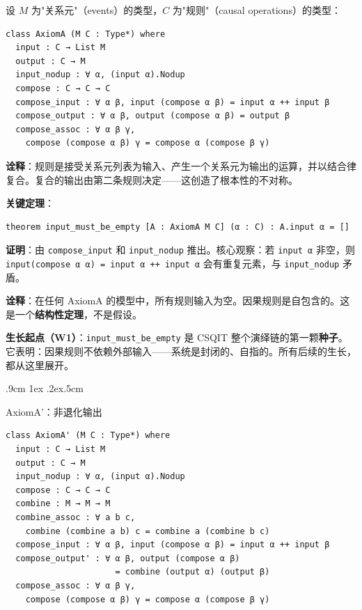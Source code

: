 \documentclass[aps,prd,twocolumn,nofootinbib,floatfix]{revtex4-2}
\makeatletter
\def\subsection{%
  \@startsection{subsection}{2}{\z@}
    {.9cm \@plus1ex \@minus .2ex}{.5cm}
    {\normalfont\large\bfseries\raggedright}%
}
\makeatother
\begin{document}
设 $M$ 为"关系元"（events）的类型，$C$ 为"规则"（causal operations）的类型：

{\scriptsize\begin{verbatim}
class AxiomA (M C : Type*) where
  input : C → List M
  output : C → M
  input_nodup : ∀ α, (input α).Nodup
  compose : C → C → C
  compose_input : ∀ α β, input (compose α β) = input α ++ input β
  compose_output : ∀ α β, output (compose α β) = output β
  compose_assoc : ∀ α β γ,
    compose (compose α β) γ = compose α (compose β γ)
\end{verbatim}}

\textbf{诠释}：规则是接受关系元列表为输入、产生一个关系元为输出的运算，并以结合律复合。复合的输出由第二条规则决定——这创造了根本性的不对称。

\textbf{关键定理}：

{\scriptsize\begin{verbatim}
theorem input_must_be_empty [A : AxiomA M C] (α : C) : A.input α = []
\end{verbatim}}

\textbf{证明}：由 \texttt{compose\_input} 和 \texttt{input\_nodup} 推出。核心观察：若 \texttt{input α} 非空，则 \texttt{input(compose α α) = input α ++ input α} 会有重复元素，与 \texttt{input\_nodup} 矛盾。

\textbf{诠释}：在任何 AxiomA 的模型中，所有规则输入为空。因果规则是自包含的。这是一个\textbf{结构性定理}，不是假设。

\textbf{生长起点（W1）}：\texttt{input\_must\_be\_empty} 是 CSQIT 整个演绎链的第一颗\textbf{种子}。它表明：因果规则不依赖外部输入——系统是封闭的、自指的。所有后续的生长，都从这里展开。

\subsection{AxiomA'：非退化输出}

{\scriptsize\begin{verbatim}
class AxiomA' (M C : Type*) where
  input : C → List M
  output : C → M
  input_nodup : ∀ α, (input α).Nodup
  compose : C → C → C
  combine : M → M → M
  combine_assoc : ∀ a b c,
    combine (combine a b) c = combine a (combine b c)
  compose_input : ∀ α β, input (compose α β) = input α ++ input β
  compose_output' : ∀ α β, output (compose α β)
                      = combine (output α) (output β)
  compose_assoc : ∀ α β γ,
    compose (compose α β) γ = compose α (compose β γ)
\end{verbatim}}
\end{document}
